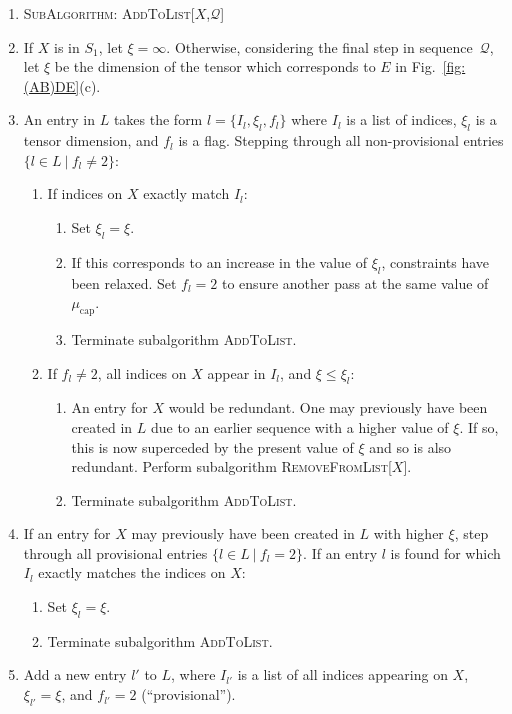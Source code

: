 \documentclass[aps,pre,reprint,superscriptaddress,amsfonts,amsmath,showpacs,nofootinbib,floatfix]{revtex4-1}
\newcommand{\mrm}[1]{\mathrm{#1}}
\newcommand{\mc}[1]{\mathcal{#1}}
\newcommand{\fref}[1]{Fig.~\ref{#1}}
\begin{document}
\begin{enumerate}
\item[] $\!\!\!\!\!\!\!$\textsc{SubAlgorithm: AddToList[$X$,$\mc{Q}$]}
\item \rule{0pt}{3.7ex}If $X$ is in $S_1$, let $\xi=\infty$. Otherwise, considering the final step in sequence~$\mc{Q}$, let $\xi$ be the dimension of the tensor which corresponds to $E$ in \fref{fig:(AB)DE}(c).
\item An entry in $L$ takes the form $l=\{I_l,\xi_l,f_l\}$ where $I_l$ is a list of indices, $\xi_l$ is a tensor dimension, and $f_l$ is a flag. Stepping through all non-provisional entries $\{l\in L~|~f_l\not=2\}$:
\begin{enumerate}
\item If indices on $X$ exactly match $I_l$:
\begin{enumerate}
\item Set $\xi_l=\xi$.
\item If this corresponds to an increase in the value of $\xi_l$, constraints have been relaxed. Set $f_l=2$ to ensure another pass at the same value of $\mu_\mrm{cap}$.
\item Terminate subalgorithm \textsc{AddToList}.
\end{enumerate}
\item If $f_l\not=2$, all indices on $X$ appear in $I_l$, and $\xi\leq \xi_l$:
\begin{enumerate}
\item An entry for $X$ would be redundant. One may previously have been created in $L$ due to an earlier sequence with a higher value of $\xi$. If so, this is now superceded by the present value of $\xi$ and so is also redundant. Perform subalgorithm \textsc{RemoveFromList[$X$]}.
\item Terminate subalgorithm \textsc{AddToList}.
\end{enumerate}
\end{enumerate}
\item If an entry for $X$ may previously have been created in $L$ with higher $\xi$, step through all provisional entries $\{l\in L~|~f_l=2\}$. If an entry $l$ is found for which $I_l$ exactly matches the indices on $X$:
\begin{enumerate}
\item Set $\xi_l=\xi$.
\item Terminate subalgorithm \textsc{AddToList}.
\end{enumerate}
\item Add a new entry $l'$ to $L$, where $I_{l'}$ is a list of all indices appearing on $X$, $\xi_{l'}=\xi$, and $f_{l'}=2$ (``provisional'').
\end{enumerate}
\end{document}
